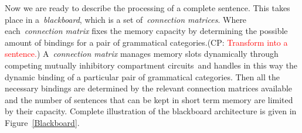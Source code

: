 \documentclass[10pt]{article}
\newcommand{\noteCP}[1]{(CP: \textcolor{red}{#1})}
\begin{document}
Now we are ready to describe the processing of a complete sentence.
This takes place in a~\emph{blackboard}, which is a set
of~\emph{connection matrices}. Where each~\emph{connection matrix}
fixes the memory capacity by determining the possible amount of
bindings for a pair of grammatical categories.\noteCP{Transform into a sentence.} A~\emph{connection matrix} manages memory
slots dynamically through competing mutually inhibitory compartment
circuits~and handles in this way the dynamic binding of a particular
pair of grammatical categories. Then all the necessary bindings are
determined by the relevant connection matrices available and the
number of sentences that can be kept in short term memory are limited
by their capacity. Complete illustration of the blackboard
architecture is given in Figure~{\ref{Blackboard}}.
\end{document}
